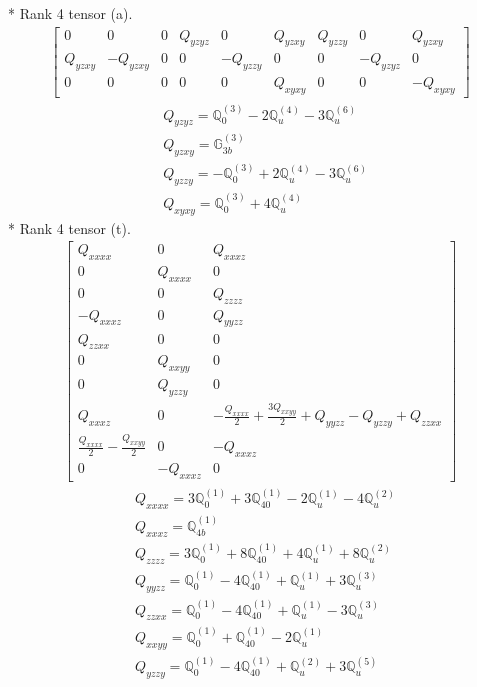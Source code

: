 \documentclass[fleqn,8pt,landscape]{jsarticle}
\begin{document}
* Rank 4 tensor (a).
\begin{align*}
\begin{bmatrix} 0 & 0 & 0 & Q_{yzyz} & 0 & Q_{yzxy} & Q_{yzzy} & 0 & Q_{yzxy} \\ Q_{yzxy} & - Q_{yzxy} & 0 & 0 & - Q_{yzzy} & 0 & 0 & - Q_{yzyz} & 0 \\ 0 & 0 & 0 & 0 & 0 & Q_{xyxy} & 0 & 0 & - Q_{xyxy} \end{bmatrix}
\end{align*}
\begin{align*}
& Q_{yzyz} = \mathbb{Q}_{0}^{(3)} - 2 \mathbb{Q}_{u}^{(4)} - 3 \mathbb{Q}_{u}^{(6)} \\
& Q_{yzxy} = \mathbb{G}_{3b}^{(3)} \\
& Q_{yzzy} = - \mathbb{Q}_{0}^{(3)} + 2 \mathbb{Q}_{u}^{(4)} - 3 \mathbb{Q}_{u}^{(6)} \\
& Q_{xyxy} = \mathbb{Q}_{0}^{(3)} + 4 \mathbb{Q}_{u}^{(4)}
\end{align*}
* Rank 4 tensor (t).
\begin{align*}
\begin{bmatrix} Q_{xxxx} & 0 & Q_{xxxz} \\ 0 & Q_{xxxx} & 0 \\ 0 & 0 & Q_{zzzz} \\ - Q_{xxxz} & 0 & Q_{yyzz} \\ Q_{zzxx} & 0 & 0 \\ 0 & Q_{xxyy} & 0 \\ 0 & Q_{yzzy} & 0 \\ Q_{xxxz} & 0 & - \frac{Q_{xxxx}}{2} + \frac{3 Q_{xxyy}}{2} + Q_{yyzz} - Q_{yzzy} + Q_{zzxx} \\ \frac{Q_{xxxx}}{2} - \frac{Q_{xxyy}}{2} & 0 & - Q_{xxxz} \\ 0 & - Q_{xxxz} & 0 \end{bmatrix}
\end{align*}
\begin{align*}
& Q_{xxxx} = 3 \mathbb{Q}_{0}^{(1)} + 3 \mathbb{Q}_{40}^{(1)} - 2 \mathbb{Q}_{u}^{(1)} - 4 \mathbb{Q}_{u}^{(2)} \\
& Q_{xxxz} = \mathbb{Q}_{4b}^{(1)} \\
& Q_{zzzz} = 3 \mathbb{Q}_{0}^{(1)} + 8 \mathbb{Q}_{40}^{(1)} + 4 \mathbb{Q}_{u}^{(1)} + 8 \mathbb{Q}_{u}^{(2)} \\
& Q_{yyzz} = \mathbb{Q}_{0}^{(1)} - 4 \mathbb{Q}_{40}^{(1)} + \mathbb{Q}_{u}^{(1)} + 3 \mathbb{Q}_{u}^{(3)} \\
& Q_{zzxx} = \mathbb{Q}_{0}^{(1)} - 4 \mathbb{Q}_{40}^{(1)} + \mathbb{Q}_{u}^{(1)} - 3 \mathbb{Q}_{u}^{(3)} \\
& Q_{xxyy} = \mathbb{Q}_{0}^{(1)} + \mathbb{Q}_{40}^{(1)} - 2 \mathbb{Q}_{u}^{(1)} \\
& Q_{yzzy} = \mathbb{Q}_{0}^{(1)} - 4 \mathbb{Q}_{40}^{(1)} + \mathbb{Q}_{u}^{(2)} + 3 \mathbb{Q}_{u}^{(5)}
\end{align*}
\end{document}
